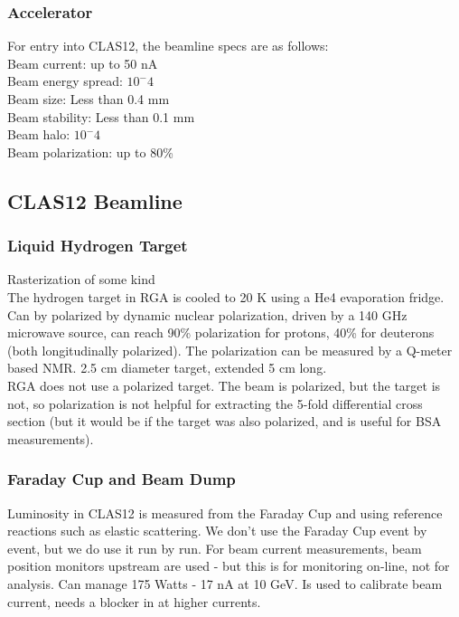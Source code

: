             \subsubsection{Accelerator}
                    For entry into CLAS12, the beamline specs are as follows:\\
                    Beam current: up to 50 nA\\
                    Beam energy spread: $10^-4$\\
                    Beam size: Less than 0.4 mm\\
                    Beam stability: Less than 0.1 mm\\
                    Beam halo: $10^-4$\\
                    Beam polarization: up to 80\%\\
    
    
            
        \subsection{CLAS12 Beamline}
            \subsubsection{Liquid Hydrogen Target}
                Rasterization of some kind
                \\
                \indent The hydrogen target in RGA is cooled to 20 K using a He4 evaporation fridge. Can by polarized by dynamic nuclear polarization, driven by a 140 GHz microwave source, can reach 90\% polarization for protons, 40\% for deuterons (both longitudinally polarized). The polarization can be measured by a Q-meter based NMR. 2.5 cm diameter target, extended 5 cm long. \\
                \indent RGA does not use a polarized target. The beam is polarized, but the target is not, so polarization is not helpful for extracting the 5-fold differential cross section (but it would be if the target was also polarized, and is useful for BSA measurements).
            
            \subsubsection{Faraday Cup and Beam Dump}
            Luminosity in CLAS12 is measured from the Faraday Cup and using reference reactions such as elastic scattering. We don't use the Faraday Cup event by event, but we do use it run by run. For beam current measurements, beam position monitors upstream are used - but this is for monitoring on-line, not for analysis.
                       Can manage 175 Watts - 17 nA at 10 GeV. Is used to calibrate beam current, needs a blocker in at higher currents.
                


